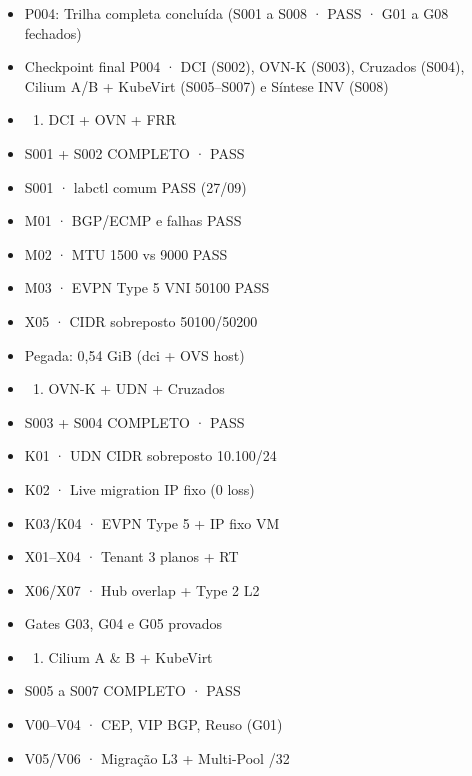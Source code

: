 \documentclass[12pt,openany,oneside,a4paper,chapter=TITLE,english,brazil]{abntex2}
\providecommand{\tightlist}{\setlength{\itemsep}{0pt}\setlength{\parskip}{0pt}}
\begin{document}
\begin{itemize}
\tightlist
\item
  P004: Trilha completa concluída (S001 a S008 · PASS · G01 a G08 fechados)
\item
  Checkpoint final P004 · DCI (S002), OVN-K (S003), Cruzados (S004), Cilium A/B + KubeVirt (S005--S007) e Síntese INV (S008)
\item
  \begin{enumerate}
  \def\labelenumi{\arabic{enumi}.}
  \tightlist
  \item
    DCI + OVN + FRR
  \end{enumerate}
\item
  S001 + S002 COMPLETO · PASS
\item
  S001 · labctl comum PASS (27/09)
\item
  M01 · BGP/ECMP e falhas PASS
\item
  M02 · MTU 1500 vs 9000 PASS
\item
  M03 · EVPN Type 5 VNI 50100 PASS
\item
  X05 · CIDR sobreposto 50100/50200
\item
  Pegada: 0,54 GiB (dci + OVS host)
\item
  \begin{enumerate}
  \def\labelenumi{\arabic{enumi}.}
  \setcounter{enumi}{1}
  \tightlist
  \item
    OVN-K + UDN + Cruzados
  \end{enumerate}
\item
  S003 + S004 COMPLETO · PASS
\item
  K01 · UDN CIDR sobreposto 10.100/24
\item
  K02 · Live migration IP fixo (0 loss)
\item
  K03/K04 · EVPN Type 5 + IP fixo VM
\item
  X01--X04 · Tenant 3 planos + RT
\item
  X06/X07 · Hub overlap + Type 2 L2
\item
  Gates G03, G04 e G05 provados
\item
  \begin{enumerate}
  \def\labelenumi{\arabic{enumi}.}
  \setcounter{enumi}{2}
  \tightlist
  \item
    Cilium A \& B + KubeVirt
  \end{enumerate}
\item
  S005 a S007 COMPLETO · PASS
\item
  V00--V04 · CEP, VIP BGP, Reuso (G01)
\item
  V05/V06 · Migração L3 + Multi-Pool /32

\end{itemize}
\end{document}

